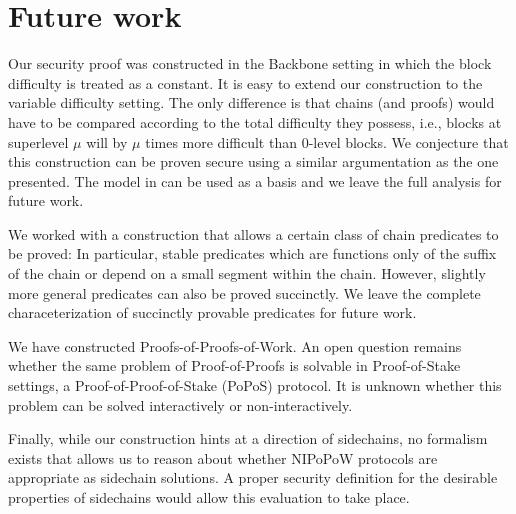 \section{Future work}

Our security proof was constructed in the Backbone \cite{backbone} setting in
which the block difficulty is treated as a constant.  It is easy to extend our
construction to the variable difficulty setting.  The only difference is that
chains (and proofs)  would have to be compared according to the total difficulty
they possess, i.e.,  blocks at superlevel $\mu$ will by $\mu$ times more
difficult than $0$-level blocks. We conjecture that this construction can be
proven secure using a similar argumentation as the one presented. The model in
\cite{backbone2} can be used as a basis and   we leave the full analysis  for
future work.

We worked with a construction that allows a certain class of chain predicates to
be proved: In particular, stable predicates which are functions only of the
suffix of the chain or depend on a small segment within the chain. However,
slightly more general predicates can also be proved succinctly. We leave the
complete characeterization of succinctly provable predicates for future work.

We have constructed Proofs-of-Proofs-of-Work. An open question remains whether
the same problem of Proof-of-Proofs is solvable in Proof-of-Stake settings, a
Proof-of-Proof-of-Stake (PoPoS) protocol. It is unknown whether this problem can
be solved interactively or non-interactively.

Finally, while our construction hints at a direction of sidechains, no formalism
exists that allows us to reason about whether NIPoPoW protocols are appropriate
as sidechain solutions. A proper security definition for the desirable
properties of sidechains would allow this evaluation to take place.

